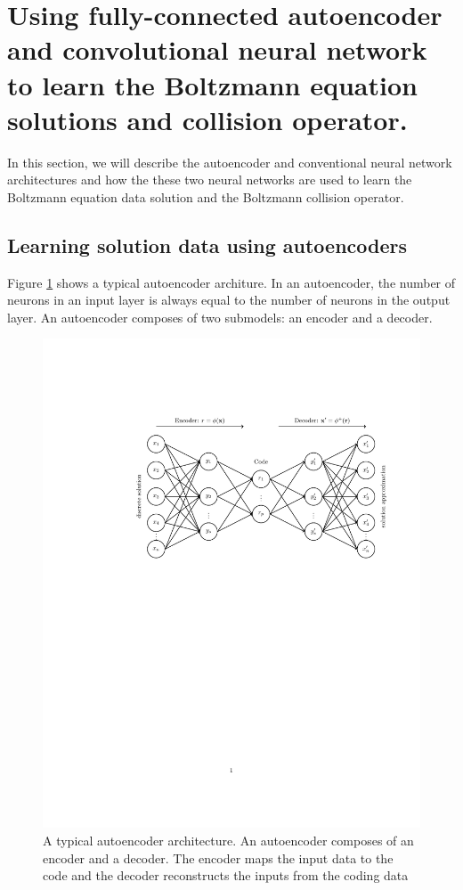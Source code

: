 \documentclass{article}
\begin{document}
\section{Using fully-connected autoencoder and convolutional neural network to learn the Boltzmann equation solutions and collision operator.}
In this section, we will describe the autoencoder and conventional neural network architectures and how the these two neural networks are used to learn the Boltzmann equation data solution and the Boltzmann collision operator. 

\subsection{Learning solution data using autoencoders}
Figure \ref{fig:ae} shows a typical autoencoder architure. In an autoencoder, the number of neurons in an input layer is always equal to the number of neurons in the output layer. An autoencoder composes of two submodels: an encoder and a decoder.
\begin{figure}
\centering
\includegraphics[width=1.0\textwidth]{Autoencoder.pdf}
\caption{A typical autoencoder architecture. An autoencoder composes of an encoder and a decoder. The encoder maps the input data to the code and the decoder reconstructs the inputs from the coding data}
\label{fig:ae}
\end{figure} 
\end{document}
